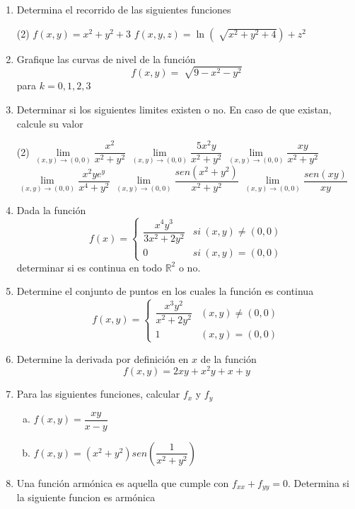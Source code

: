 \documentclass[12pt]{article}
\newenvironment{preguntas}
{\begin{enumerate}\itemsep12pt
	}
	{
	\end{enumerate}
}
\newcommand{\R}{\mathbb{R}}
\begin{document}
\begin{preguntas}
\begin{tasks}
\task $f(x, y) = \sqrt[]{x+y} + \ln(x^2+y^2)$
\task $f(x,y) = \dfrac{x+y}{x^2-y^2}$
\task $f(x,y,z) = ln(z+y) - \dfrac{1}{x^2 +z^2}$
\task $f(x,y,z) = \sqrt[]{\ln(x+y+z)}$
\end{tasks}
\item Determina el recorrido de las siguientes funciones
\begin{tasks}(2)
\task $f(x,y) = x^2 + y^2 + 3$
\task $f(x,y,z) = \ln(\sqrt[]{x^2+y^2+4}) + z^2$
\end{tasks}
\item Grafique las curvas de nivel de la función 
	$$ f(x,y) = \sqrt[]{9-x^2-y^2}$$
	para $k=0,1,2,3$
\item Determinar si los siguientes limites existen o no. En caso de que existan, calcule su valor
\begin{tasks}(2)
\task $\lim\limits_{(x,y) \to (0,0)} \dfrac{x^2}{x^2+y^2}$
\task $\lim\limits_{(x,y) \to (0,0)} \dfrac{5x^2y}{x^2+y^2}$
\task $\lim\limits_{(x,y) \to (0,0)} \dfrac{xy}{x^2+y^2}$
\task $\lim\limits_{(x,y) \to (0,0)} \dfrac{x^2ye^y}{x^4+y^2}$
\task $\lim\limits_{(x,y) \to (0,0)} \dfrac{sen(x^2+y^2)}{x^2+y^2}$
\task $\lim\limits_{(x,y) \to (0,0)} \dfrac{sen(xy)}{xy}$
\end{tasks}
\item Dada la función 
	$$ f(x) = 
	\begin{cases}
	\dfrac{x^4y^3}{3x^2+2y^2} & si\ (x,y) \neq (0,0) \\
	0 & si\ (x,y) = (0,0)
	\end{cases}
	$$
	determinar si es continua en todo $\R^2$ o no.
\item Determine el conjunto de puntos en los cuales la función es continua
	$$f(x,y) = 
	\begin{cases}
	\dfrac{x^3y^2}{x^2+2y^2} & (x,y) \neq (0,0)\\
	1 & (x,y) = (0,0)
	\end{cases}
	$$
\item Determine la derivada por definición en $x$ de la función
	$$f(x,y) = 2xy + x^2y + x + y$$
\item Para las siguientes funciones, calcular $f_x$ y $f_y$
\begin{enumerate}[a)]
\item $f(x,y) = \dfrac{xy}{x-y}$
\item $f(x,y) = (x^2+y^2)sen\left(\dfrac{1}{x^2+y^2}\right)$
\end{enumerate}
\item Una función armónica es aquella que cumple con $f_{xx} + f_{yy} = 0$. Determina si la siguiente funcion es armónica

\end{preguntas}
\end{document}
